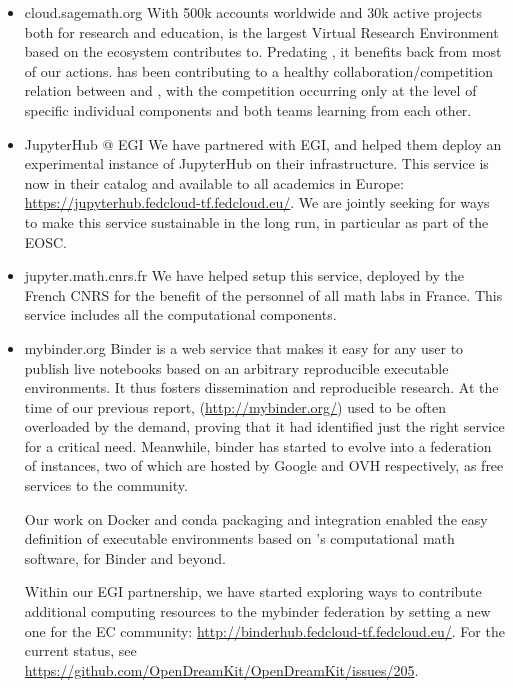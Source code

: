 \begin{itemize}
\item{cloud.sagemath.org} With 500k accounts worldwide and 30k active
  projects both for research and education, \SMC is the largest
  Virtual Research Environment based on the ecosystem \ODK contributes
  to. Predating \ODK, it benefits back from most of our actions. \ODK
  has been contributing to a healthy collaboration/competition
  relation between \JupyterHub and \SMC, with the competition
  occurring only at the level of specific individual components and
  both teams learning from each other.

\item{JupyterHub @ EGI} We have partnered with EGI, and helped them
  deploy an experimental instance of JupyterHub on their
  infrastructure. This service is now in their catalog and available
  to all academics in Europe:
  \url{https://jupyterhub.fedcloud-tf.fedcloud.eu/}. We are jointly
  seeking for ways to make this service sustainable in the long run,
  in particular as part of the EOSC.

\item{jupyter.math.cnrs.fr} We have helped setup this \JupyterHub
  service, deployed by the French CNRS for the benefit of the
  personnel of all math labs in France. This service includes all the
  \ODK computational components.

\item{mybinder.org} Binder is a web service that makes it easy for any
  user to publish live notebooks based on an arbitrary reproducible
  executable environments. It thus fosters dissemination and
  reproducible research. At the time of our previous report,
  (\url{http://mybinder.org/}) used to be often overloaded by the demand,
  proving that it had identified just the right service for a critical
  need. Meanwhile, binder has started to evolve into a federation
  of instances, two of which are hosted by Google and OVH
  respectively, as free services to the community.

  Our work on Docker and conda packaging
   and \Jupyter
  integration  enabled the easy
  definition of executable environments based on \ODK's computational
  math software, for Binder and beyond.

  Within our EGI partnership, we have started exploring ways to
  contribute additional computing resources to the mybinder
  federation by setting a new one for the EC community:
  \url{http://binderhub.fedcloud-tf.fedcloud.eu/}.
  For the current status, see
  \url{https://github.com/OpenDreamKit/OpenDreamKit/issues/205}.


\end{itemize}

